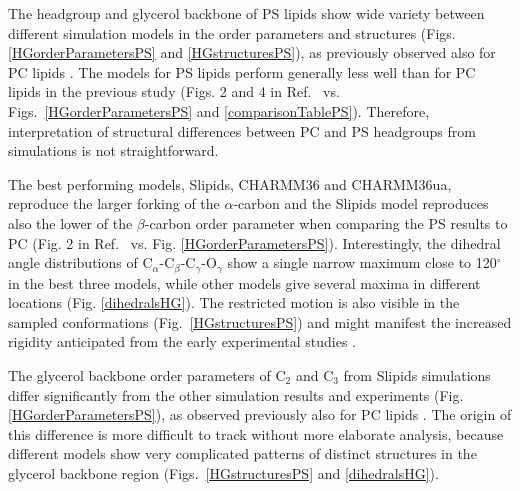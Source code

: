 \documentclass[aps,prl,superscriptaddress,twocolumn]{revtex4}
\begin{document}
The headgroup and glycerol backbone of PS lipids show wide variety between different simulation
models in the order parameters and structures (Figs. \ref{HGorderParametersPS} and \ref{HGstructuresPS}),
as previously observed also for PC lipids \cite{botan15}. The models for PS lipids perform generally less well than for
PC lipids in the previous study
(Figs. 2 and 4 in Ref.~\cite{botan15} vs. Figs.~\ref{HGorderParametersPS} and \ref{comparisonTablePS}).
Therefore, interpretation of structural differences between PC and PS headgroups
from simulations is not straightforward.

The best performing models,
Slipids, CHARMM36 and CHARMM36ua, reproduce the larger forking of the $\alpha$-carbon 
and the Slipids model reproduces also the lower of the $\beta$-carbon order parameter
when comparing the PS results to PC (Fig. 2 in Ref.~ vs. Fig. \ref{HGorderParametersPS}).
Interestingly, the dihedral angle distributions of C$_\alpha$-C$_\beta$-C$_\gamma$-O$_\gamma$ show
a single narrow maximum close to 120$^{\circ}$ in the best three models, while other models give several maxima
in different locations (Fig. \ref{dihedralsHG}). The restricted motion is also
visible in the sampled conformations (Fig.~\ref{HGstructuresPS}) and might
manifest the increased rigidity anticipated from the early experimental studies \cite{browning80,buldt81}.

The glycerol backbone order parameters of C$_2$ and C$_3$ from Slipids simulations
differ significantly from the other simulation results and experiments (Fig. \ref{HGorderParametersPS}),
as observed previously also for PC lipids \cite{botan15}.
The origin of this difference is more difficult to track without more elaborate analysis,
because different models show very complicated patterns of distinct structures
in the glycerol backbone region (Figs.~\ref{HGstructuresPS} and \ref{dihedralsHG}).


\end{document}
